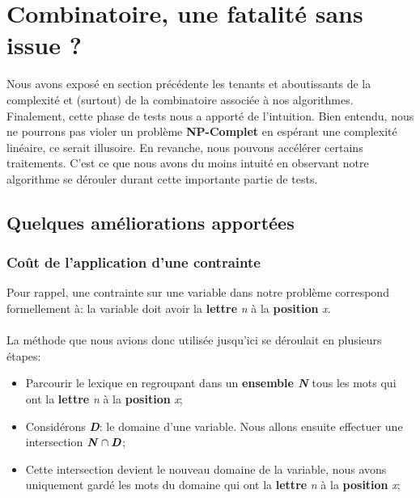 \documentclass [ 11 pt ] {article}
\begin{document}
    
    \section{Combinatoire, une fatalité sans issue ?}
    Nous avons exposé en section précédente les tenants et aboutissants de la complexité et (surtout) de la combinatoire associée à nos algorithmes. Finalement, cette phase de tests nous a apporté de l'intuition. Bien entendu, nous ne pourrons pas violer un problème \textbf{NP-Complet} en espérant une complexité linéaire, ce serait illusoire. En revanche, nous pouvons accélérer certains traitements. C'est ce que nous avons du moins intuité en observant notre algorithme se dérouler durant cette importante partie de tests. 
    
    \subsection{Quelques améliorations apportées}
        \subsubsection{Coût de l’application d’une contrainte}
            Pour rappel, une contrainte sur une variable dans notre problème correspond formellement à: \guillemotleft  la variable doit avoir la  \textbf{lettre} \textit{n} à la \textbf{position} \textit{x}\guillemotright. 
            \\\\
            La méthode que nous avions donc utilisée jusqu’ici se déroulait en plusieurs étapes:
            \begin{itemize}
                \item Parcourir le lexique en regroupant dans un \textbf{ensemble \textit{N}} tous les mots qui ont la \textbf{lettre} \textit{n} à la \textbf{position} \textit{x};
                \item Considérons \textbf{\textit{D}}: le domaine d’une variable. Nous allons ensuite effectuer une intersection $\textbf{\textit{N}} \cap \textbf{\textit{D}}$;
                \item Cette intersection devient le nouveau domaine de la variable, nous avons uniquement gardé les mots du domaine qui ont la \textbf{lettre} \textit{n} à la \textbf{position} \textit{x};
            \end{itemize}
            
\end{document}
